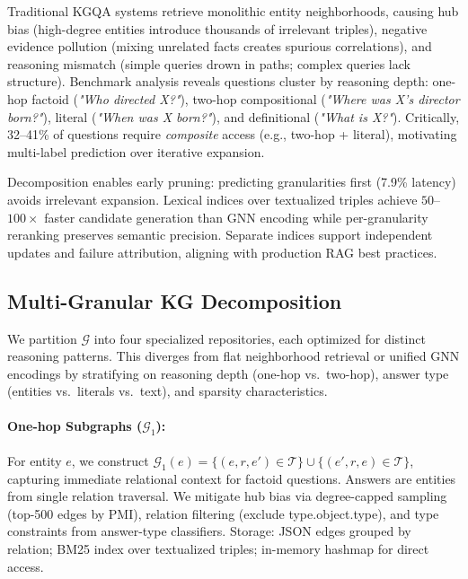 \documentclass[conference]{IEEEtran}
\begin{document}
Traditional KGQA systems retrieve monolithic entity neighborhoods, causing hub bias (high-degree entities introduce thousands of irrelevant triples), negative evidence pollution (mixing unrelated facts creates spurious correlations), and reasoning mismatch (simple queries drown in paths; complex queries lack structure). Benchmark analysis reveals questions cluster by reasoning depth: one-hop factoid (\emph{"Who directed X?"}), two-hop compositional (\emph{"Where was X's director born?"}), literal (\emph{"When was X born?"}), and definitional (\emph{"What is X?"}). Critically, 32--41\% of questions require \emph{composite} access (e.g., two-hop + literal), motivating multi-label prediction over iterative expansion.

Decomposition enables early pruning: predicting granularities first (7.9\% latency) avoids irrelevant expansion. Lexical indices over textualized triples achieve $50$--$100\times$ faster candidate generation than GNN encoding while per-granularity reranking preserves semantic precision. Separate indices support independent updates and failure attribution, aligning with production RAG best practices.

\subsection{Multi-Granular KG Decomposition}
\label{sec:decomposition}

We partition $\mathcal{G}$ into four specialized repositories, each optimized for distinct reasoning patterns. This diverges from flat neighborhood retrieval or unified GNN encodings by stratifying on reasoning depth (one-hop vs.\ two-hop), answer type (entities vs.\ literals vs.\ text), and sparsity characteristics.

\paragraph{One-hop Subgraphs ($\mathcal{G}_1$):}
For entity $e$, we construct $\mathcal{G}_1(e) = \{(e, r, e') \in \mathcal{T}\} \cup \{(e', r, e) \in \mathcal{T}\}$, capturing immediate relational context for factoid questions. Answers are entities from single relation traversal. We mitigate hub bias via degree-capped sampling (top-500 edges by PMI), relation filtering (exclude type.object.type), and type constraints from answer-type classifiers. Storage: JSON edges grouped by relation; BM25 index over textualized triples; in-memory hashmap for direct access.
\end{document}
